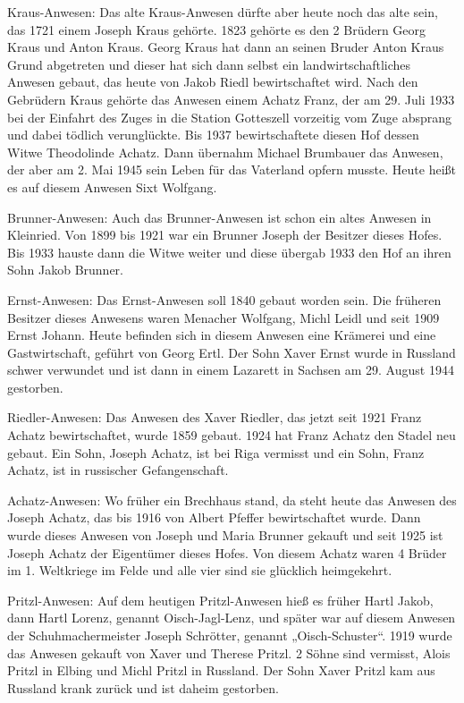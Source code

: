 \documentclass{book}
\begin{document}
Kraus-Anwesen: Das alte Kraus-Anwesen dürfte aber heute noch das alte sein, das
1721 einem Joseph Kraus gehörte. 1823 gehörte es den 2 Brüdern Georg Kraus und
Anton Kraus. Georg Kraus hat dann an seinen Bruder Anton Kraus Grund abgetreten
und dieser hat sich dann selbst ein landwirtschaftliches Anwesen gebaut, das
heute von Jakob Riedl bewirtschaftet wird. Nach den Gebrüdern Kraus gehörte das
Anwesen einem Achatz Franz, der am 29. Juli 1933 bei der Einfahrt des Zuges in
die Station Gotteszell vorzeitig vom Zuge absprang und dabei tödlich
verunglückte. Bis 1937 bewirtschaftete diesen Hof dessen Witwe Theodolinde
Achatz. Dann übernahm Michael Brumbauer das Anwesen, der aber am 2. Mai 1945
sein Leben für das Vaterland opfern musste. Heute heißt es auf diesem Anwesen
Sixt Wolfgang.

Brunner-Anwesen: Auch das Brunner-Anwesen ist schon ein altes Anwesen in
Kleinried. Von 1899 bis 1921 war ein Brunner Joseph der Besitzer dieses Hofes.
Bis 1933 hauste dann die Witwe weiter und diese übergab 1933 den Hof an ihren
Sohn Jakob Brunner.

Ernst-Anwesen: Das Ernst-Anwesen soll 1840 gebaut worden sein. Die früheren
Besitzer dieses Anwesens waren Menacher Wolfgang, Michl Leidl und seit 1909
Ernst Johann. Heute befinden sich in diesem Anwesen eine Krämerei und eine
Gastwirtschaft, geführt von Georg Ertl. Der Sohn Xaver Ernst wurde in Russland
schwer verwundet und ist dann in einem Lazarett in Sachsen am 29. August 1944
gestorben.

Riedler-Anwesen: Das Anwesen des Xaver Riedler, das jetzt seit 1921 Franz Achatz
bewirtschaftet, wurde 1859 gebaut. 1924 hat Franz Achatz den Stadel neu gebaut.
Ein Sohn, Joseph Achatz, ist bei Riga vermisst und ein Sohn, Franz Achatz, ist
in russischer Gefangenschaft.

Achatz-Anwesen: Wo früher ein Brechhaus stand, da steht heute das Anwesen des
Joseph Achatz, das bis 1916 von Albert Pfeffer bewirtschaftet wurde. Dann wurde
dieses Anwesen von Joseph und Maria Brunner gekauft und seit 1925 ist Joseph
Achatz der Eigentümer dieses Hofes. Von diesem Achatz waren 4 Brüder im 1.
Weltkriege im Felde und alle vier sind sie glücklich heimgekehrt.

Pritzl-Anwesen: Auf dem heutigen Pritzl-Anwesen hieß es früher Hartl Jakob, dann
Hartl Lorenz, genannt Oisch-Jagl-Lenz, und später war auf diesem Anwesen der
Schuhmachermeister Joseph Schrötter, genannt „Oisch-Schuster“. 1919 wurde das
Anwesen gekauft von Xaver und Therese Pritzl. 2 Söhne sind vermisst, Alois
Pritzl in Elbing und Michl Pritzl in Russland. Der Sohn Xaver Pritzl kam aus
Russland krank zurück und ist daheim gestorben.
\end{document}
